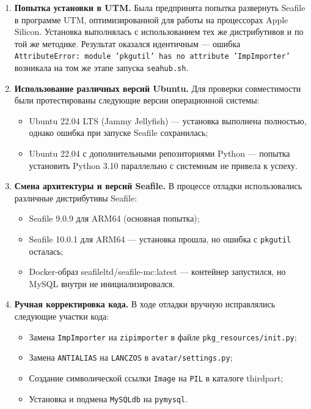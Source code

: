 \documentclass[a4paper,14pt,oneside,openany]{memoir}
\begin{document}
\begin{enumerate}
    \item \textbf{Попытка установки в UTM.} Была предпринята попытка развернуть Seafile в программе UTM, оптимизированной для работы на процессорах Apple Silicon. Установка выполнялась с использованием тех же дистрибутивов и по той же методике. Результат оказался идентичным — ошибка \texttt{AttributeError: module 'pkgutil' has no attribute 'ImpImporter'} возникала на том же этапе запуска \texttt{seahub.sh}.

    \item \textbf{Использование различных версий Ubuntu.} Для проверки совместимости были протестированы следующие версии операционной системы:
    \begin{itemize}
        \item Ubuntu 22.04 LTS (Jammy Jellyfish) — установка выполнена полностью, однако ошибка при запуске Seafile сохранилась;
        \item Ubuntu 22.04 с дополнительными репозиториями Python — попытка установить Python 3.10 параллельно с системным не привела к успеху.
    \end{itemize}

    \item \textbf{Смена архитектуры и версий Seafile.} В процессе отладки использовались различные дистрибутивы Seafile:
    \begin{itemize}
        \item Seafile 9.0.9 для ARM64 (основная попытка);
        \item Seafile 10.0.1 для ARM64 — установка прошла, но ошибка с \texttt{pkgutil} осталась;
        \item Docker-образ seafileltd/seafile-mc:latest — контейнер запустился, но MySQL внутри не инициализировался.
    \end{itemize}

        \item \textbf{Ручная корректировка кода.} В ходе отладки вручную исправлялись следующие участки кода:
    \begin{itemize}
        \item Замена \texttt{ImpImporter} на \texttt{zipimporter} в файле \texttt{pkg\_resources/init.py};
        \item Замена \texttt{ANTIALIAS} на \texttt{LANCZOS} в \texttt{avatar/settings.py};
        \item Создание символической ссылки \texttt{Image} на \texttt{PIL} в каталоге thirdpart;
        \item Установка и подмена \texttt{MySQLdb} на \texttt{pymysql}.
    \end{itemize}
\end{enumerate}
\end{document}
